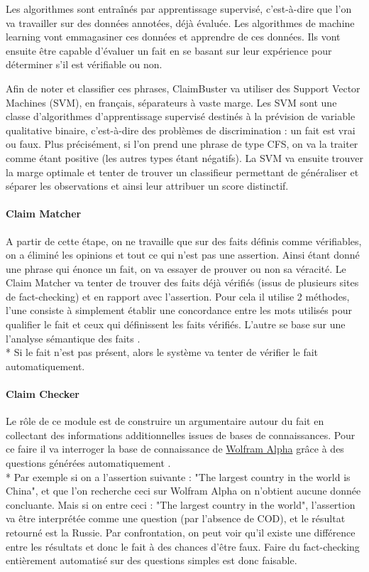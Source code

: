 Les algorithmes sont entraînés par apprentissage supervisé, c'est-à-dire que l'on va travailler sur des données annotées, déjà évaluée. Les algorithmes de machine learning vont emmagasiner ces données et apprendre de ces données. Ils vont ensuite être capable d'évaluer un fait en se basant sur leur expérience pour déterminer s'il est vérifiable ou non.

Afin de noter et classifier ces phrases, ClaimBuster va utiliser des Support Vector Machines (SVM), en français, séparateurs à vaste marge. Les SVM sont une classe d'algorithmes d'apprentissage supervisé destinés à la prévision de variable qualitative binaire, c'est-à-dire des problèmes de discrimination : un fait est vrai ou faux. Plus précisément, si l'on prend une phrase de type CFS, on va la traiter comme étant positive (les autres types étant négatifs). La SVM va ensuite trouver la marge optimale et tenter de trouver un classifieur permettant de généraliser et séparer les observations et ainsi leur attribuer un score distinctif.

\paragraph{Claim Matcher}

A partir de cette étape, on ne travaille que sur des faits définis comme vérifiables, on a éliminé les opinions et tout ce qui n'est pas une assertion. Ainsi étant donné une phrase qui énonce un fait, on va essayer de prouver ou non sa véracité. Le Claim Matcher va tenter de trouver des faits déjà vérifiés (issus de plusieurs sites de fact-checking) et en rapport avec l'assertion. Pour cela il utilise 2 méthodes, l'une consiste à simplement établir une concordance entre les mots utilisés pour qualifier le fait et ceux qui définissent les faits vérifiés. L'autre se base sur une l'analyse sémantique des faits \cite{rus2013semilar}. 
\\*
Si le fait n'est pas présent, alors le système va tenter de vérifier le fait automatiquement.

\paragraph{Claim Checker}

Le rôle de ce module est de construire un argumentaire autour du fait en collectant des informations additionnelles issues de bases de connaissances. Pour ce faire il va interroger la base de connaissance de \href{https://www.wolframalpha.com/about.html}{Wolfram Alpha} grâce à des questions générées automatiquement \cite{heilman2009question}. 
\\*
Par exemple si on a l'assertion suivante : "The largest country in the world is China", et que l'on recherche ceci sur Wolfram Alpha on n'obtient aucune donnée concluante. Mais si on entre ceci : "The largest country in the world", l'assertion va être interprétée comme une question (par l'absence de COD), et le résultat retourné est la Russie. Par confrontation, on peut voir qu'il existe une différence entre les résultats et donc le fait à des chances d'être faux. Faire du fact-checking entièrement automatisé sur des questions simples est donc faisable.

